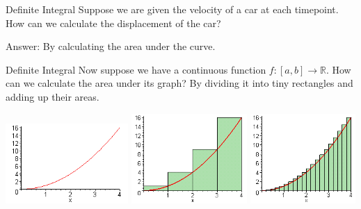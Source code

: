 \documentclass{beamer}
\newcommand{\R}{\mathbb{R}}
\begin{document}
\begin{frame}{Definite Integral}
Suppose we are given the velocity of a car at each timepoint. How can we calculate the displacement of the car?
\begin{center}
    

\end{center}
\pause Answer: By calculating the area under the curve.


\end{frame}

\begin{frame}{Definite Integral}
Now suppose we have a continuous function $f:[a,b]\to\R$. How can we calculate the area under its graph? \pause By dividing it into tiny rectangles and adding up their areas.

\begin{center}

    \includegraphics[width=0.35\textwidth, height=\textheight, keepaspectratio]{p1.png}   \includegraphics[width=0.33\textwidth, height=\textheight, keepaspectratio]{p2.png}   \includegraphics[width=0.3\textwidth, height=\textheight, keepaspectratio]{p3.png}
  \end{center}
\end{frame}
\end{document}
